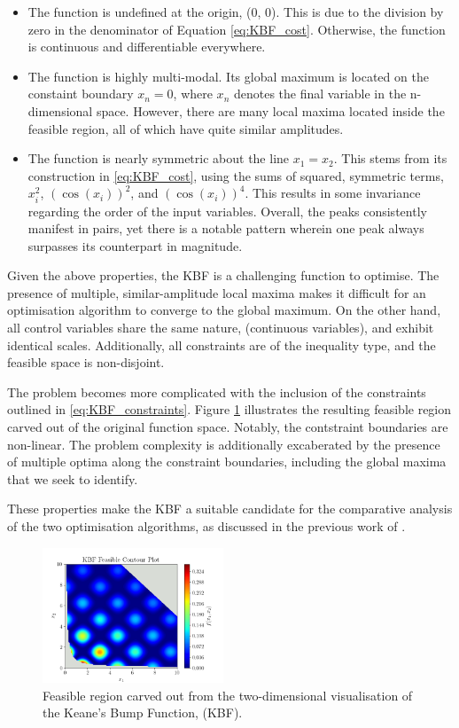 \documentclass[10pt]{article}
\begin{document}
\begin{multicols}{2}
\begin{itemize}
    \item The function is undefined at the origin, (0, 0). This is due to the division by zero in the denominator of Equation \ref{eq:KBF_cost}. Otherwise, the function is continuous and differentiable everywhere.
    \item The function is highly multi-modal. Its global maximum is located on the constaint boundary $x_{n}=0$, where $x_n$ denotes the final variable in the n-dimensional space. However, there are many local maxima located inside the feasible region, all of which have quite similar amplitudes.
    \item The function is nearly symmetric about the line $x_1=x_2$. This stems from its construction in \ref{eq:KBF_cost}, using the sums of squared, symmetric terms, $x_i^2$, $(\cos(x_i))^2$, and $(\cos(x_i))^4$. This results in some invariance regarding the order of the input variables. Overall, the peaks consistently manifest in pairs, yet there is a notable pattern wherein one peak always surpasses its counterpart in magnitude.
\end{itemize}

Given the above properties, the KBF is a challenging function to optimise. The presence of multiple, similar-amplitude local maxima makes it difficult for an optimisation algorithm to converge to the global maximum. On the other hand, all control variables share the same nature, (continuous variables), and exhibit identical scales. Additionally, all constraints are of the inequality type, and the feasible space is non-disjoint.

The problem becomes more complicated with the inclusion of the constraints outlined in \ref{eq:KBF_constraints}. Figure \ref{fig:KBF_Feasible} illustrates the resulting feasible region carved out of the original function space. Notably, the contstraint boundaries are non-linear. The problem complexity is additionally excaberated by the presence of multiple optima along the constraint boundaries, including the global maxima that we seek to identify.

These properties make the KBF a suitable candidate for the comparative analysis of the two optimisation algorithms, as discussed in the previous work of \cite{ELBELTAGY1999639}.

\begin{figure}[H]
    \centering
    \includegraphics[width=0.48\textwidth]{../figures/KBF/KBF Feasible_contour.png}
    \captionsetup{justification=centering}
    \caption{Feasible region carved out from the two-dimensional visualisation of the Keane's Bump Function, (KBF).}
    \label{fig:KBF_Feasible}
\end{figure}


\end{multicols}
\end{document}
